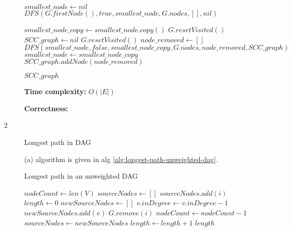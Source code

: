 \documentclass{article}
\begin{document}
\begin{description}
\begin{algorithm}[h]
\begin{algorithmic}[1]
      \State $smallest\_node \gets nil$
      \State $DFS(G.firstNode(), true, smallest\_node, G.nodes, [], nil)$

      \State $smallest\_node\_copy \gets smallest\_node.copy()$
      \State $G.resetVisited()$
      \State $SCC\_graph \gets nil$
        \State $G.resetVisited()$
        \State $node\_removed \gets []$
        \State $DFS(smallest\_node, false, smallest\_node\_copy, G.nodes, node\_removed, SCC\_graph)$
        \State $smallest\_node \gets smallest\_node\_copy$
        \State $SCC\_graph.addNode(node\_removed)$
      \EndWhile

      \State \Return $SCC\_graph$
    \EndFunction
    
    \end{algorithmic}
  \end{algorithm}

  \textbf{Time complexity:} $O(|E|)$

  \textbf{Correctness:}

\item[2]{Longest path in DAG}

  (a) algorithm is given in alg \ref{alg:longest-path-unweighted-dag}.

  \begin{algorithm}[h]
  \caption{Longest path in an unweighted DAG}
  \label{alg:longest-path-unweighted-DAG}
    \begin{algorithmic}[1]
  
      \State $nodeCount \gets len(V)$
      \State $sourceNodes \gets []$
          \State $sourceNodes.add(i)$
        \EndIf
      \EndFor
      \State $length \gets 0$
        \State $newSourceNodes \gets []$
            \State $v.inDegree \gets v.inDegree - 1$
              \State $newSourceNodes.add(v)$
            \EndIf
          \EndFor
          \State $G.remove(i)$
          \State $nodeCount \gets nodeCount - 1$
        \EndFor
        \State $sourceNodes \gets newSourceNodes$
        \State $length \gets length + 1$
      \EndWhile
      \State \Return $length$
    \EndFunction
    
    \end{algorithmic}
  \end{algorithm}


\end{description}
\end{document}
